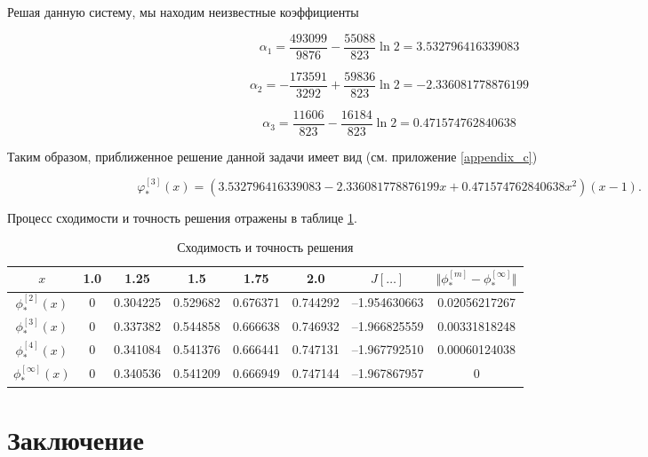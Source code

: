 \documentclass{article}
\begin{document}
\noindent Решая данную систему, мы находим неизвестные коэффициенты

\begin{displaymath}
	\alpha_{1} = \frac{493099}{9876} - \frac{55088}{823}\ln{2} = 3.532796416339083
\end{displaymath}

\begin{equation}
	\alpha_{2} = -\frac{173591}{3292} + \frac{59836}{823}\ln{2} = -2.336081778876199
\end{equation}

\begin{displaymath}
	\alpha_{3} = \frac{11606}{823} - \frac{16184}{823}\ln{2} = 0.471574762840638
\end{displaymath}

\noindent Таким образом, приближенное решение данной задачи имеет вид (см. приложение \ref{appendix_c})

\begin{equation}
	\varphi_{\ast}^{[3]}(x) = (3.532796416339083 - 2.336081778876199x + 0.471574762840638 x^2)(x-1).
\end{equation}

Процесс сходимости и точность решения отражены в таблице \ref{table_process_of_convergence_rank_3}.

\begin{table}[!h]
\centering
\begin{tabular}{|c|c|c|c|c|c|c|c|}
	\hline
	$x$ & 1.0 & 1.25 & 1.5 & 1.75 & 2.0 & $J[\ldots]$ & $\Vert \phi_{\ast}^{[m]} - \phi_{\ast}^{[\infty]} \Vert$ \\
	\hline \hline

	$\phi_{\ast}^{[2]}(x)$ & 0 & 0.304225 & 0.529682 & 0.676371 & 0.744292 & –1.954630663 & 0.02056217267 \\	\hline
	$\phi_{\ast}^{[3]}(x)$ & 0 & 0.337382 & 0.544858 & 0.666638 & 0.746932 & –1.966825559 & 0.00331818248 \\	\hline
	$\phi_{\ast}^{[4]}(x)$ & 
0 & 0.341084 & 0.541376 & 0.666441 & 0.747131 & –1.967792510 & 0.00060124038 \\	\hline
	$\phi_{\ast}^{[\infty]}(x)$ & 0 & 0.340536 & 0.541209 & 0.666949 & 0.747144 & –1.967867957 & 0 \\	\hline

\end{tabular}
\caption{Сходимость и точность решения}
\label{table_process_of_convergence_rank_3}
\end{table}

\section*{Заключение}
\end{document}
